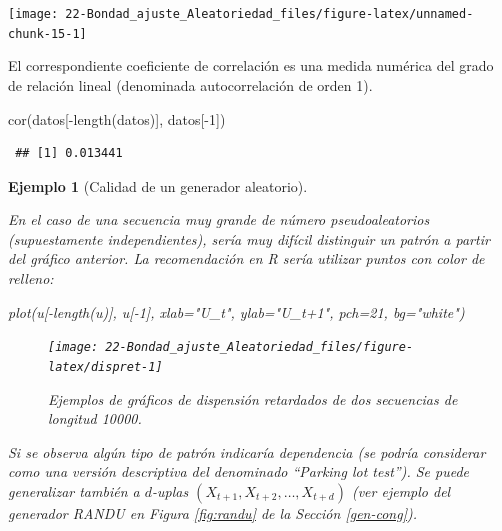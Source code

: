 \documentclass[
  10pt,
]{book}
\newenvironment{Shaded}{\begin{snugshade}}{\end{snugshade}}
\newcommand{\AttributeTok}[1]{\textcolor[rgb]{0.77,0.63,0.00}{#1}}
\newcommand{\DecValTok}[1]{\textcolor[rgb]{0.00,0.00,0.81}{#1}}
\newcommand{\FunctionTok}[1]{\textcolor[rgb]{0.00,0.00,0.00}{#1}}
\newcommand{\NormalTok}[1]{#1}
\newcommand{\SpecialCharTok}[1]{\textcolor[rgb]{0.00,0.00,0.00}{#1}}
\newcommand{\StringTok}[1]{\textcolor[rgb]{0.31,0.60,0.02}{#1}}
\theoremstyle{break}
\newtheorem{example}{Ejemplo}[chapter]
\theoremstyle{nonumberplain}
\begin{document}
\begin{center}\texttt{[image: 22-Bondad\_ajuste\_Aleatoriedad\_files/figure-latex/unnamed-chunk-15-1]} \end{center}

El correspondiente coeficiente de correlación es una medida numérica del grado de relación lineal (denominada autocorrelación de orden 1).

\begin{Shaded}
\begin{Highlighting}[]
\FunctionTok{cor}\NormalTok{(datos[}\SpecialCharTok{{-}}\FunctionTok{length}\NormalTok{(datos)], datos[}\SpecialCharTok{{-}}\DecValTok{1}\NormalTok{])}
\end{Highlighting}
\end{Shaded}

\begin{verbatim}
 ## [1] 0.013441
\end{verbatim}

\begin{example}[Calidad de un generador aleatorio]
\protect\hypertarget{exm:ret-gen}{}\label{exm:ret-gen}

En el caso de una secuencia muy grande de número pseudoaleatorios (supuestamente independientes), sería muy difícil distinguir un patrón a partir del gráfico anterior.
La recomendación en R sería utilizar puntos con color de relleno:

\begin{Shaded}
\begin{Highlighting}[]
\FunctionTok{plot}\NormalTok{(u[}\SpecialCharTok{{-}}\FunctionTok{length}\NormalTok{(u)], u[}\SpecialCharTok{{-}}\DecValTok{1}\NormalTok{], }\AttributeTok{xlab=}\StringTok{"U\_t"}\NormalTok{, }\AttributeTok{ylab=}\StringTok{"U\_t+1"}\NormalTok{, }\AttributeTok{pch=}\DecValTok{21}\NormalTok{, }\AttributeTok{bg=}\StringTok{"white"}\NormalTok{)}
\end{Highlighting}
\end{Shaded}

\begin{figure}[!htbp]

{\centering \texttt{[image: 22-Bondad\_ajuste\_Aleatoriedad\_files/figure-latex/dispret-1]} 

}

\caption{Ejemplos de gráficos de dispensión retardados de dos secuencias de longitud 10000.}\label{fig:dispret}
\end{figure}

Si se observa algún tipo de patrón indicaría dependencia (se podría considerar como una versión descriptiva del denominado ``Parking lot test'').
Se puede generalizar también a \(d\)-uplas \((X_{t+1},X_{t+2},\ldots,X_{t+d})\)
(ver ejemplo del generador RANDU en Figura \ref{fig:randu} de la Sección \ref{gen-cong}).
\end{example}
\end{document}
